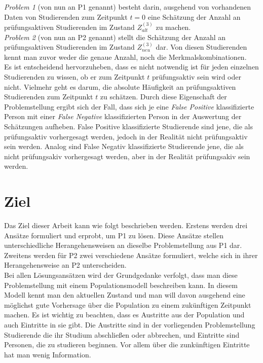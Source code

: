 \textit{Problem 1} (von nun an P1 genannt) besteht darin, ausgehend von vorhandenen Daten von Studierenden zum Zeitpunkt $t = 0$
eine Sch\"atzung der Anzahl an pr\"ufungsaktiven Studierenden im Zustand $Z_{alt}^{(3)}$ zu machen. \\

\textit{Problem 2} (von nun an P2 genannt) stellt die Sch\"atzung der Anzahl an pr\"ufungsaktiven Studierenden im Zustand $Z_{neu}^{(3)}$ dar. Von diesen
Studierenden kennt man zuvor weder die genaue Anzahl, noch die Merkmalskombinationen. \\


Es ist entscheidend hervorzuheben, dass es nicht notwendig ist f\"ur jeden einzelnen Studierenden zu wissen, ob er
zum Zeitpunkt $t$  pr\"ufungsaktiv sein wird oder nicht. Vielmehr geht es darum, die absolute H\"aufigkeit an pr\"ufungsaktiven
Studierenden zum Zeitpunkt $t$ zu sch\"atzen. Durch diese Eigenschaft der Problemstellung ergibt sich der Fall,
dass sich je eine \textit{False Positive} klassifizierte Person mit einer
\textit{False Negative} klassifizierten Person in der Auswertung der Sch\"atzungen aufheben. False Positive klassifizierte Studierende sind jene, die
als pr\"ufungsaktiv vorhergesagt werden, jedoch in der Realit\"at nicht pr\"ufungsaktiv sein werden. Analog sind False Negativ klassifizierte Studierende jene, die
als nicht pr\"ufungsakiv  vorhergesagt werden, aber in der Realit\"at pr\"ufungsakiv sein werden.  \\



\section{Ziel}
Das Ziel dieser Arbeit kann wie folgt beschrieben werden. Erstens werden drei Ans\"atze formuliert und erprobt,
um P1 zu l\"osen. Diese Ans\"atze stellen unterschiedliche Herangehensweisen an dieselbe Problemstellung aus P1 dar.
Zweitens werden f\"ur P2 zwei verschiedene Ans\"atze formuliert, welche sich in ihrer Herangehensweise an P2 unterscheiden. \\


Bei allen L\"osungsans\"atzen wird der Grundgedanke verfolgt, dass man diese Problemstellung mit einem Populationsmodell beschreiben kann.
In diesem Modell kennt man den aktuellen Zustand und man will davon ausgehend eine m\"oglichst gute Vorhersage \"uber die Population zu einem zuk\"unftigen
Zeitpunkt machen. Es ist wichtig zu beachten, dass es Austritte aus der Population und auch Eintritte in sie gibt. Die Austritte sind in der vorliegenden Problemstellung
Studierende die ihr Studium abschlie{\ss}en oder abbrechen, und Eintritte sind Personen, die zu studieren beginnen. Vor allem \"uber die zunk\"unftigen Eintritte
hat man wenig Information. \\


